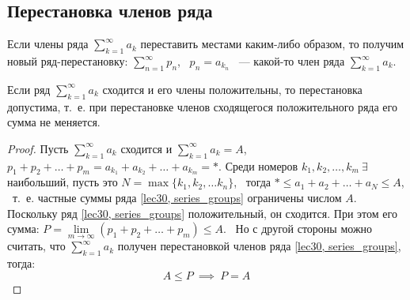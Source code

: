 \documentclass[../../main.tex]{subfiles}
\begin{document}
\subsection{Перестановка членов ряда}
Если члены ряда $\sum\limits_{k = 1}^{\infty} a_k$
переставить местами каким-либо образом, то получим новый ряд-перестановку:
$\sum\limits_{n = 1}^{\infty} p_n$, \
$p_n = a_{k_n}$ ~--- какой-то член ряда $\sum\limits_{k = 1}^{\infty} a_k$.
\begin{thm}
	Если ряд $\sum\limits_{k = 1}^{\infty} a_k$ сходится и его члены положительны,
	то перестановка допустима, т.~е. при перестановке членов сходящегося
	положительного ряда его сумма не меняется.
\end{thm}
\begin{proof}
	Пусть $\sum\limits_{k = 1}^{\infty} a_k$  сходится и
	$\sum\limits_{k = 1}^{\infty} a_k = A$, \ \
	$p_1 + p_2 + \ldots + p_m = a_{k_1} + a_{k_2} + \ldots + a_{k_m} = *$.
	Среди номеров $k_1, k_2, \ldots , k_m \ \exists$ наибольший, пусть это
	$N = \max\{k_1, k_2, \ldots k_n\}$, \ тогда $* \leq a_1 + a_2 + \ldots +
	a_N \leq A$, \ т.~е. частные суммы ряда \eqref{lec30, series_groups}
	ограничены числом $A$. Поскольку ряд \eqref{lec30, series_groups}
	положительный, он сходится. При этом его сумма:
	$P = \lim\limits_{m \to \infty}(p_1 + p_2 + \ldots + p_m) \leq A$. \
	Но с другой стороны можно считать, что $\sum\limits_{k = 1}^{\infty} a_k$
	получен перестановкой членов ряда \eqref{lec30, series_groups}, тогда:
	\[A \leq P \ \implies \ P = A\]
\end{proof}
\end{document}

